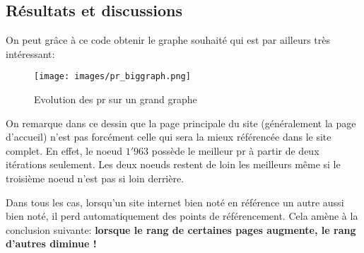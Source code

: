 \documentclass[12pt,twoside, openright]{memoir}
\begin{document}
	\subsection{Résultats et discussions}
	On peut grâce à ce code obtenir le graphe souhaité qui est par ailleurs très intéressant:
	\begin{figure}[!ht]
		\center
		\texttt{[image: images/pr\_biggraph.png]}
		\caption{Evolution des \gls{pr} sur un grand graphe}
	\end{figure}\par
	On remarque dans ce dessin que la page principale du site (généralement la page d'accueil) n'est pas forcément celle qui sera la mieux référencée dans le site complet. En effet, le noeud $1'963$ possède le meilleur \gls{pr} à partir de deux itérations seulement. Les deux noeuds restent de loin les meilleurs même si le troisième noeud n'est pas si loin derrière.\par
	Dans tous les cas, lorsqu'un site internet bien noté en référence un autre aussi bien noté, il perd automatiquement des points de référencement. Cela amène à la conclusion suivante: \textbf{lorsque le rang de certaines pages augmente, le rang d'autres diminue !}

\end{document}
